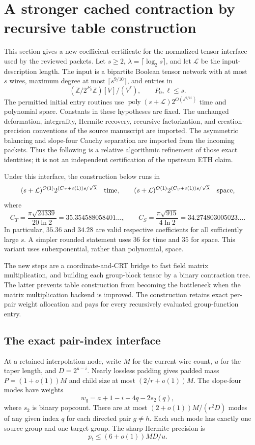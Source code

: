 \section{A stronger cached contraction by recursive table construction}
\label{sec:cached-tree}

This section gives a new coefficient certificate for the normalized tensor interface used by the reviewed packets. Let $s\ge2$, $\lambda=\lceil\log_2s\rceil$, and let $\mathcal L$ be the input-description length. The input is a bipartite Boolean tensor network with at most $s$ wires, maximum degree at most $\lceil s^{9/10}\rceil$, and entries in
\[
 (\mathbb Z/2^{P_0}\mathbb Z)[V]/(V^\ell),\qquad P_0,\ell\le s.
\]
The permitted initial entry routines use $\operatorname{poly}(s+\mathcal L)2^{O(s^{9/10})}$ time and polynomial space. Constants in these hypotheses are fixed. The unchanged deformation, integrality, Hermite recovery, recursive factorization, and creation-precision conventions of the source manuscript are imported. The asymmetric balancing and slope-four Cauchy separation are imported from the incoming packets. Thus the following is a relative algorithmic refinement of those exact identities; it is not an independent certification of the upstream ETH claim.

\begin{theorem}
\label{thm:cached-tree}
Under this interface, the construction below runs in
\[
 (s+\mathcal L)^{O(1)}2^{(C_T+o(1))s/\sqrt\lambda}
 \quad\hbox{time},\qquad
 (s+\mathcal L)^{O(1)}2^{(C_S+o(1))s/\sqrt\lambda}
 \quad\hbox{space},
\]
where
\[
 C_T=\frac{\pi\sqrt{24339}}{20\ln2}=35.354588058401\ldots,\qquad
 C_S=\frac{\pi\sqrt{915}}{4\ln2}=34.274803005023\ldots .
\]
In particular, $35.36$ and $34.28$ are valid respective coefficients for all sufficiently large $s$. A simpler rounded statement uses $36$ for time and $35$ for space. This variant uses subexponential, rather than polynomial, space.
\end{theorem}

The new steps are a coordinate-and-CRT bridge to fast field matrix multiplication, and building each group-block tensor by a binary contraction tree. The latter prevents table construction from becoming the bottleneck when the matrix multiplication backend is improved. The construction retains exact per-pair weight allocation and pays for every recursively evaluated group-function entry.

\subsection{The exact pair-index interface}
At a retained interpolation node, write $M$ for the current wire count, $u$ for the taper length, and $D=2^{a-i}$. Nearly lossless padding gives padded mass $P=(1+o(1))M$ and child size at most $(2/r+o(1))M$. The slope-four modes have weights
\[
 w_q=a+1-i+4q-2s_2(q),
\]
where $s_2$ is binary popcount. There are at most $(2+o(1))M/(r^2D)$ modes of any given index $q$ for each directed pair $g\ne h$. Each such mode has exactly one source group and one target group. The sharp Hermite precision is
\[
 p_t\le(6+o(1))MD/u.
\]

